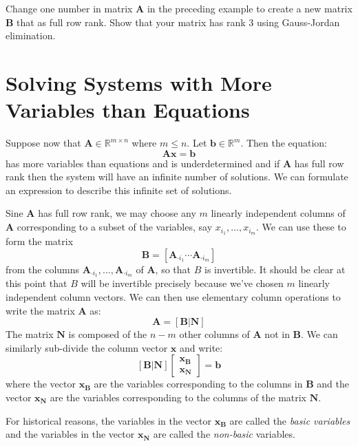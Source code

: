 \begin{exercise} Change one number in matrix $\mathbf{A}$ in the preceding example to create a new matrix $\mathbf{B}$ that as full row rank. Show that your matrix has rank 3 using Gauss-Jordan elimination.
\end{exercise}

\section{Solving Systems with More Variables than Equations}
Suppose now that $\mathbf{A} \in \mathbb{R}^{m \times n}$ where $m \leq n$. Let $\mathbf{b} \in \mathbb{R}^m$. Then the equation:
\begin{equation}
\mathbf{A}\mathbf{x} = \mathbf{b}
\end{equation} 
has more variables than equations and is underdetermined and if $\mathbf{A}$ has full row rank then the system will have an infinite number of solutions. We can formulate an expression to describe this infinite set of solutions. 

Sine $\mathbf{A}$ has full row rank, we may choose any $m$ linearly independent columns of $\mathbf{A}$ corresponding to a subset of the variables, say $x_{i_1},\dots,x_{i_m}$. We can use these to form the matrix
\begin{equation}
\mathbf{B} = \left[\mathbf{A}_{\cdot i_1}\cdots \mathbf{A}_{\cdot i_m}\right]
\end{equation}
from the columns $\mathbf{A}_{\cdot i_1},\dots, \mathbf{A}_{\cdot i_m}$ of $\mathbf{A}$, so that $B$ is invertible. It should be clear at this point that $B$ will be invertible precisely because we've chosen $m$ linearly independent column vectors. We can then use elementary column operations to write the matrix $\mathbf{A}$ as:
\begin{equation}
\mathbf{A} = \left[\mathbf{B} | \mathbf{N}\right]
\end{equation}
The matrix $\mathbf{N}$ is composed of the $n-m$ other columns of $\mathbf{A}$ not in $\mathbf{B}$. We can similarly sub-divide the column vector $\mathbf{x}$ and write:
\begin{equation}
 \left[\mathbf{B} | \mathbf{N}\right] \begin{bmatrix}\mathbf{x}_\mathbf{B}\\\mathbf{x}_\mathbf{N}\end{bmatrix} = \mathbf{b}
\end{equation}
where the vector $\mathbf{x}_\mathbf{B}$ are the variables corresponding to the columns in $\mathbf{B}$ and the vector $\mathbf{x}_\mathbf{N}$ are the variables corresponding to the columns of the matrix $\mathbf{N}$. 
\begin{definition} For historical reasons, the variables in the vector $\mathbf{x}_\mathbf{B}$ are called the \textit{basic variables} and the variables in the vector $\mathbf{x}_\mathbf{N}$ are called the \textit{non-basic} variables.
\end{definition}

